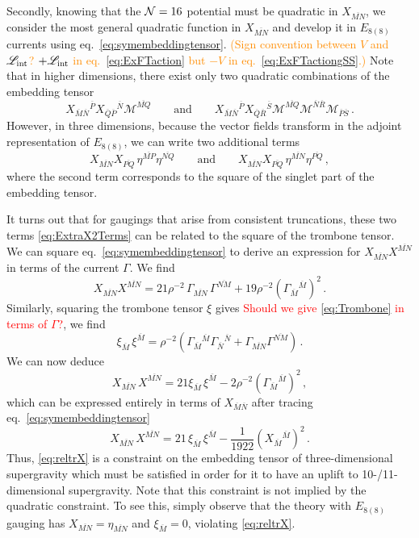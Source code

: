 \documentclass[a4paper, 11pt]{article}
\numberwithin{equation}{section}
\newcommand{\ov}[1]{\overline{#1}}
\newcommand{\EE}{\ensuremath{E_{8(8)}}\xspace}
\newcommand{\En}[1]{E_{#1(#1)}}
\newcommand{\+}{\oplus}
\newcommand{\gM}{\mathcal{M}}
\newcommand{\fl}[1]{\ov{#1}}
\newcommand{\EM}[1]{\textcolor{red}{#1}}
\newcommand{\CE}[1]{\textcolor{darkorange}{#1}}
\begin{document}
Secondly, knowing that the ${\cal N}=16$ potential must be quadratic in $X_{\fl{MN}}$, we consider the most general quadratic function in $X_{\fl{MN}}$ and develop it in \EE currents using eq.~\eqref{eq:symembeddingtensor}. \CE{(Sign convention between $V$ and ${\mathscr{L}}_{\rm int}$? $+{\mathscr{L}}_{\rm int}$ in eq.~\eqref{eq:ExFTaction} but $-V$ in eq.~\eqref{eq:ExFTactiongSS}.)} Note that in higher dimensions, there exist only two quadratic combinations of the embedding tensor
\begin{equation}
	X_{\fl{M}\fl{N}}{}^{\fl{P}} X_{\fl{Q}\fl{P}}{}^{\fl{N}} \gM^{\fl{MQ}} \qquad \text{and} \qquad X_{\fl{M}\fl{N}}{}^{\fl{P}} X_{\fl{Q}\fl{R}}{}^{\fl{S}} \gM^{\fl{MQ}} \gM^{\fl{N}\fl{R}} \gM_{\fl{P}\fl{S}} \,.
\end{equation}
However, in three dimensions, because the vector fields transform in the adjoint representation of $\EE$, we can write two additional terms
\begin{equation} \label{eq:ExtraX2Terms}
	X_{\fl{MN}} X_{\fl{PQ}}\, \eta^{\fl{MP}} \eta^{\fl{NQ}} \qquad \text{and} \qquad X_{\fl{MN}} X_{\fl{PQ}}\, \eta^{\fl{MN}} \eta^{\fl{PQ}} \,,
\end{equation}
where the second term corresponds to the square of the singlet part of the embedding tensor.

It turns out that for gaugings that arise from consistent truncations, these two terms \eqref{eq:ExtraX2Terms} can be related to the square of the trombone tensor. We can square eq.~\eqref{eq:symembeddingtensor} to derive an expression for $X_{\ov{MN}}X^{\ov{MN}}$ in terms of the current $\Gamma$. We find 
\begin{equation}\label{eq:XXwitheta}
	X_{\ov{MN}}X^{\ov{MN}} = 21 \rho^{-2}\, \Gamma_{\ov{MN}}\, \Gamma^{\ov{NM}} + 19 \rho^{-2}\left(\Gamma_{\ov M}{}^{\ov M}\right)^2\,.
\end{equation}
Similarly, squaring the trombone tensor $\xi$ gives \EM{Should we give \eqref{eq:Trombone} in terms of $\Gamma$?}, we find
\begin{equation}\label{eq:xixiwitheta}
	\xi_{\ov M}\,\xi^{\ov M}=\rho^{-2}\left(\Gamma_{\ov M}{}^{\ov M}\Gamma_{\ov N}{}^{\ov N}+\Gamma_{\ov{MN}}\Gamma^{\ov{NM}}\right) \,.
\end{equation}
We can now deduce
\begin{equation}
	X_{\ov{MN}} \,X^{\ov{MN}}=21	\xi_{\ov M} \, \xi^{\ov M} - 2 \rho^{-2}\left(\Gamma_{\ov M}{}^{\ov M}\right)^2 \,,
\end{equation}
which can be expressed entirely in terms of $X_{\fl{M}\fl{N}}$ after tracing eq.~\eqref{eq:symembeddingtensor}
\begin{equation}\label{eq:reltrX}
	X_{\ov{MN}}\,X^{\ov{MN}} = 21\, \xi_{\ov M}\, \xi^{\ov M} - \frac1{1922}\left(X_{\ov M}{}^{\ov M}\right)^2 \,. 
\end{equation}
Thus, \eqref{eq:reltrX} is a constraint on the embedding tensor of three-dimensional supergravity which must be satisfied in order for it to have an uplift to 10-/11-dimensional supergravity. Note that this constraint is not implied by the quadratic constraint. To see this, simply observe that the theory with $\En{8}$ gauging has $X_{\ov{MN}}=\eta_{\ov{MN}}$ and $\xi_{\fl{M}} = 0$, violating \eqref{eq:reltrX}.
\end{document}
